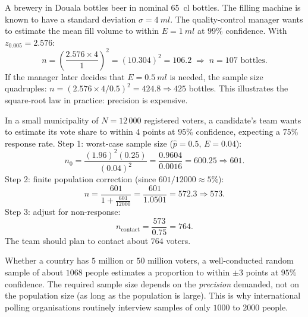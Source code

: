 \documentclass[11pt]{article}
\begin{document}
\begin{experience}
A brewery in Douala bottles beer in nominal \SI{65}{cl} bottles. The filling machine is known to have a standard deviation $\sigma = \SI{4}{ml}$. The quality-control manager wants to estimate the mean fill volume to within $E = \SI{1}{ml}$ at $99\%$ confidence.
\tcblower
With $z_{0.005} = 2.576$:
\[
n = \left(\dfrac{2.576 \times 4}{1}\right)^{2} = (10.304)^{2} = 106.2 \;\Rightarrow\; n = 107 \text{ bottles}.
\]
If the manager later decides that $E = \SI{0.5}{ml}$ is needed, the sample size quadruples: $n = (2.576\times4/0.5)^2 = 424.8 \Rightarrow 425$ bottles. This illustrates the square-root law in practice: precision is expensive.
\end{experience}

\begin{experience}
In a small municipality of $N = 12\,000$ registered voters, a candidate's team wants to estimate its vote share to within $4$ points at $95\%$ confidence, expecting a $75\%$ response rate.
\tcblower
Step 1: worst-case sample size ($\hat p = 0.5$, $E=0.04$):
\[
n_0 = \dfrac{(1.96)^2(0.25)}{(0.04)^2} = \dfrac{0.9604}{0.0016} = 600.25 \Rightarrow 601.
\]
Step 2: finite population correction (since $601/12000 \approx 5\%$):
\[
n = \dfrac{601}{1 + \frac{601}{12000}} = \dfrac{601}{1.0501} = 572.3 \Rightarrow 573.
\]
Step 3: adjust for non-response:
\[
n_{\text{contact}} = \dfrac{573}{0.75} = 764.
\]
The team should plan to contact about $764$ voters.
\end{experience}

\begin{savaistu}
Whether a country has $5$ million or $50$ million voters, a well-conducted random sample of about $1068$ people estimates a proportion to within $\pm 3$ points at $95\%$ confidence. The required sample size depends on the \emph{precision} demanded, not on the population size (as long as the population is large). This is why international polling organisations routinely interview samples of only $1000$ to $2000$ people.
\end{savaistu}
\end{document}
